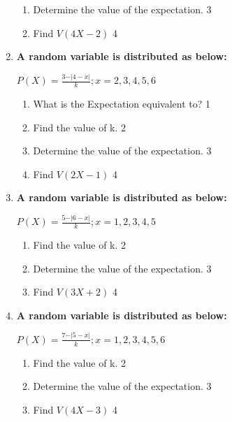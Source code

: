 \documentclass[a4paper,oneside, margin=1.4in]{book}
\begin{document}
\begin{enumerate}
  \begin{enumerate}
    \item
    	Determine the value of the expectation. \hfill 3
     \item
     	Find $V(4X-2)$ \hfill 4
  \end{enumerate}
  
        \item \textbf{A random variable is distributed as below:}
        
        \begin{center}
  \textbf{$P(X) = \frac{3-\vert 4-x\vert}{k}; x=2,3,4,5,6$}
  \end{center}

  \begin{enumerate}
    \item
	What is the Expectation equivalent to? \hfill 1
    \item
    	Find the value of k. \hfill 2
    \item
    	Determine the value of the expectation. \hfill 3
     \item
     	Find $V(2X-1)$ \hfill 4
  \end{enumerate}
  
  \item \textbf{A random variable is distributed as below:}

\begin{center}
  \textbf{$P(X) = \frac{5-\vert 6-x\vert}{k}; x=1,2,3,4,5$}
\end{center}

\begin{enumerate}
  \item
  	Find the value of k. \hfill 2
  \item
  	Determine the value of the expectation. \hfill 3
  \item
  	Find $V(3X+2)$ \hfill 4
\end{enumerate}

\item \textbf{A random variable is distributed as below:}

\begin{center}
  \textbf{$P(X) = \frac{7-\vert 5-x\vert}{k}; x=1,2,3,4,5,6$}
\end{center}

\begin{enumerate}
  \item
  	Find the value of k. \hfill 2
  \item
  	Determine the value of the expectation. \hfill 3
  \item
  	Find $V(4X-3)$ \hfill 4
\end{enumerate}


\end{enumerate}
\end{document}
